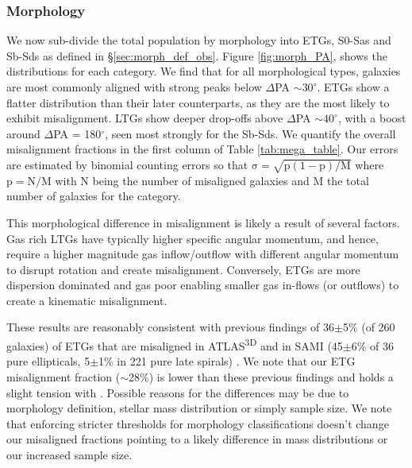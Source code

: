 \subsubsection{Morphology}
We now sub-divide the total population by morphology into ETGs, S0-Sas and Sb-Sds as defined in \S\ref{sec:morph_def_obs}. Figure \ref{fig:morph_PA}, shows the distributions for each category. We find that for all morphological types, galaxies are most commonly aligned with strong peaks below $\Delta$PA $\sim 30^{\circ}$. ETGs show a flatter distribution than their later counterparts, as they are the most likely to exhibit misalignment. LTGs show deeper drop-offs above $\Delta$PA $\sim 40^{\circ}$, with a boost around $\Delta$PA = 180$^{\circ}$, seen most strongly for the Sb-Sds. We quantify the overall misalignment fractions in the first column of Table \ref{tab:mega_table}. Our errors are estimated by binomial counting errors so that $\mathrm{\sigma = \sqrt{p(1-p) / M}}$ where $\mathrm{p = N/M}$ with $\mathrm{N}$ being the number of misaligned galaxies and $\mathrm{M}$ the total number of galaxies for the category.

This morphological difference in misalignment is likely a result of several factors. Gas rich LTGs have typically higher specific angular momentum, and hence, require a higher magnitude gas inflow/outflow with different angular momentum to disrupt rotation and create misalignment. Conversely, ETGs are more dispersion dominated and gas poor enabling smaller gas in-flows (or outflows) to create a kinematic misalignment. 

These results are reasonably consistent with previous findings of 36$\pm$5\% (of 260 galaxies) of ETGs that are misaligned in ATLAS\textsuperscript{3D} and in SAMI (45$\pm$6\% of 36 pure ellipticals, 5$\pm$1\% in 221 pure late spirals) \citep[][]{davis2011, bryant2019}. We note that our ETG misalignment fraction ($\sim$28\%) is lower than these previous findings and holds a slight tension with \citet{bryant2019}. Possible reasons for the differences may be due to morphology definition, stellar mass distribution or simply sample size. We note that enforcing stricter thresholds for morphology classifications doesn't change our misaligned fractions pointing to a likely difference in mass distributions or our increased sample size. 

